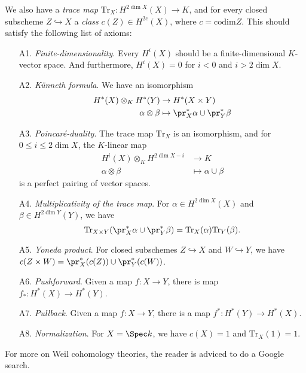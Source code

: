 \documentclass[11pt, english]{article}
\begin{document}
We also have a \emph{trace map} $\mathrm{Tr}_X:H^{2\dim X}(X) \to K$, and for every closed subscheme $Z \hookrightarrow X$ a \emph{class} $c(Z) \in H^{2c}(X)$, where $c= \mathrm{codim } Z$. This should satisfy the following list of axioms:
\begin{enumerate}[A]
\item[A1. ] \emph{Finite-dimensionality}. Every $H^i(X)$ should be a finite-dimensional $K$-vector space. And furthermore, $H^i(X)=0$ for $i < 0$ and $i > 2 \dim X$. 
\item[A2. ] \emph{Künneth formula}. We have an isomorphism
\begin{align*}
H^\ast (X) \otimes_K H^\ast(Y)  &\to H^\ast(X \times Y) \\
\alpha \otimes \beta &\mapsto \pr_X^\ast \alpha \cup \pr_Y^\ast \beta
\end{align*}
\item[A3. ] \emph{Poincaré-duality}. The trace map $\mathrm{Tr}_X$ is an isomorphism, and for $0 \leq i \leq 2 \dim X$, the $K$-linear map
\begin{align*}
H^i(X) \otimes_K H^{2\dim X-i} &\to K \\
\alpha \otimes \beta &\mapsto \alpha \cup \beta
\end{align*}
is a perfect pairing of vector spaces.

\item[A4. ] \emph{Multiplicativity of the trace map}. For $\alpha \in H^{2 \dim X}(X)$ and $\beta \in H^{2 \dim Y}(Y)$, we have
\[
\mathrm{Tr}_{X \times Y}(\pr_X^\ast \alpha \cup \pr_Y^\ast \beta) = \mathrm{Tr}_X(\alpha) \mathrm{Tr}_Y(\beta).
\]

\item[A5. ] \emph{Yoneda product}. For closed subschemes $Z \hookrightarrow X$ and $W \hookrightarrow Y$, we have $c(Z \times W) = \pr_X^\ast (c(Z)) \cup \pr_Y^\ast(c(W))$. 

\item[A6. ] \emph{Pushforward}. Given a map $f:X \to Y$, there is map $f_\ast:H^\ast(X) \to H^\ast(Y)$.

\item[A7. ] \emph{Pullback}. Given a map $f:X \to Y$, there is a map $f^\ast:H^\ast(Y) \to H^\ast(X)$.

\item[A8. ] \emph{Normalization}. For $X = \Spec k$, we have $c(X)=1$ and $\mathrm{Tr}_X(1)=1$.
\end{enumerate}

For more on Weil cohomology theories, the reader is adviced to do a Google search.
\end{document}
